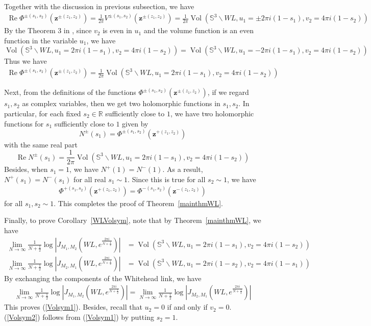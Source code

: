 \documentclass[10pt,a4paper]{article}
\newcommand{\lt}{\left}
\newcommand{\rt}{\right}
\def\Vol{\operatorname{Vol}}
\def \Re{\operatorname{Re}}
\def\SS{{\mathbb S}}
\def\RR{{\mathbb R}}
\def\Vol{\operatorname{Vol}}
\def \Re{\operatorname{Re}}
\begin{document}
Together with the discussion in previous subsection, we have
\begin{align*}
\Re \Phi^{\pm(s_1,s_2)}(\mathbf{z}^{\pm(z_1,z_2)})
= \frac{1}{2\pi} V^{\pm(s_1,s_2)} (\mathbf{z}^{\pm(z_1,z_2)}) 
= \frac{1}{2\pi}\Vol\lt(\SS^3 \backslash WL, u_1 = \pm 2\pi i (1 - s_1), v_2 = 4\pi i(1-s_2)\rt)
\end{align*}
By the Theorem 3 in \cite{NZ85}, since $v_2$ is even in $u_1$ and the volume function is an even function in the variable $u_1$, we have 
$$\Vol\lt(\SS^3 \backslash WL, u_1 = 2\pi i (1 - s_1), v_2 = 4\pi i(1-s_2)\rt)=\Vol\lt(\SS^3 \backslash WL, u_1 = - 2\pi i (1 - s_1), v_2 = 4\pi i(1-s_2)\rt)$$
Thus we have
\begin{align}
\Re \Phi^{\pm(s_1,s_2)}(\mathbf{z}^{\pm(z_1,z_2)})
= \frac{1}{2\pi}\Vol\lt(\SS^3 \backslash WL, u_1 =  2\pi i (1 - s_1), v_2 = 4\pi i(1-s_2)\rt)
\end{align}

Next, from the definitions of the functions $\Phi^{\pm(s_1,s_2)}(\mathbf{z}^{\pm(z_1,z_2)})$, if we regard $s_1,s_2$ as complex variables, then we get two holomorphic functions in $s_1,s_2$. In particular, for each fixed $s_2\in \RR$ sufficiently close to $1$, we have two holomorphic functions for $s_1$ sufficiently close to $1$ given by
$$ N^\pm(s_1) = \Phi^{\pm(s_1,s_2)}(\mathbf{z}^{+(z_1,z_2)}) $$
with the same real part
$$ \Re N^\pm (s_1) = \frac{1}{2\pi}\Vol\lt(\SS^3 \backslash WL, u_1 =  2\pi i (1 - s_1), v_2 = 4\pi i(1-s_2)\rt) $$
Besides, when $s_1=1$, we have $N^+(1)=N^-(1)$. As a result, $N^+(s_1)=N^-(s_1)$ for all real $s_1 \sim 1$. Since this is true for all $s_2\sim 1$, we have
\begin{align}
 \Phi^{+(s_1,s_2)}(\mathbf{z}^{+(z_1,z_2)})
= \Phi^{-(s_1,s_2)}(\mathbf{z}^{-(z_1,z_2)})
\end{align}
for all $s_1,s_2\sim 1$. This completes the proof of Theorem~\ref{mainthmWL}.

Finally, to prove Corollary~\ref{WLVolsym}, note that by Theorem~\ref{mainthmWL}, we have
\begin{align}
\lim_{N\to\infty} \frac{1}{N+\frac{1}{2}}\log\lt|J_{M_1,M_2}(WL, e^{\frac{2\pi i}{N+\frac{1}{2}}})\rt| &= \Vol(\SS^3\backslash WL, u_1 = 2\pi i(1-s_1), v_2= 4\pi i(1-s_2)) \\
\lim_{N\to\infty} \frac{1}{N+\frac{1}{2}}\log\lt|J_{M_2,M_1}(WL, e^{\frac{2\pi i}{N+\frac{1}{2}}})\rt| &= \Vol(\SS^3\backslash WL, u_1 = 2\pi i(1-s_2), v_2= 4\pi i(1-s_1))
\end{align}
By exchanging the components of the Whitehead link, we have 
\begin{align}
\lim_{N\to\infty} \frac{1}{N+\frac{1}{2}}\log\lt|J_{M_1,M_2}(WL, e^{\frac{2\pi i}{N+\frac{1}{2}}})\rt| 
=
\lim_{N\to\infty} \frac{1}{N+\frac{1}{2}}\log\lt|J_{M_2,M_1}(WL, e^{\frac{2\pi i}{N+\frac{1}{2}}})\rt|
\end{align}
This proves (\ref{Volsym1}). Besides, recall that $u_2=0$ if and only if $v_2=0$. (\ref{Volsym2}) follows from (\ref{Volsym1}) by putting $s_2=1$.
\end{document}
